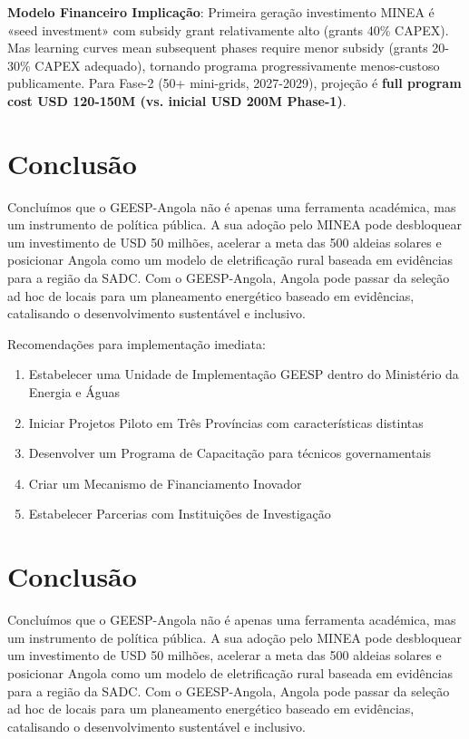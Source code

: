 \documentclass[12pt, a4paper]{article}
\begin{document}
{{{{{{{{{{{{\textbf{Modelo Financeiro Implicação}: Primeira geração investimento MINEA é «seed investment» com subsidy grant relativamente alto (grants 40\% CAPEX). Mas learning curves mean subsequent phases require menor subsidy (grants 20-30\% CAPEX adequado), tornando programa progressivamente menos-custoso publicamente. Para Fase-2 (50+ mini-grids, 2027-2029), projeção é \textbf{full program cost USD 120-150M (vs. inicial USD 200M Phase-1)}.

\section{Conclusão}

Concluímos que o GEESP-Angola não é apenas uma ferramenta académica, mas um instrumento de política pública. A sua adoção pelo MINEA pode desbloquear um investimento de USD 50 milhões, acelerar a meta das 500 aldeias solares e posicionar Angola como um modelo de eletrificação rural baseada em evidências para a região da SADC. Com o GEESP-Angola, Angola pode passar da seleção ad hoc de locais para um planeamento energético baseado em evidências, catalisando o desenvolvimento sustentável e inclusivo.

Recomendações para implementação imediata:
\begin{enumerate}
\item Estabelecer uma Unidade de Implementação GEESP dentro do Ministério da Energia e Águas
\item Iniciar Projetos Piloto em Três Províncias com características distintas
\item Desenvolver um Programa de Capacitação para técnicos governamentais
\item Criar um Mecanismo de Financiamento Inovador
\item Estabelecer Parcerias com Instituições de Investigação
\end{enumerate}

\section{Conclusão}

Concluímos que o GEESP-Angola não é apenas uma ferramenta académica, mas um instrumento de política pública. A sua adoção pelo MINEA pode desbloquear um investimento de USD 50 milhões, acelerar a meta das 500 aldeias solares e posicionar Angola como um modelo de eletrificação rural baseada em evidências para a região da SADC. Com o GEESP-Angola, Angola pode passar da seleção ad hoc de locais para um planeamento energético baseado em evidências, catalisando o desenvolvimento sustentável e inclusivo.

}}}}}}}}}}}}
\end{document}
